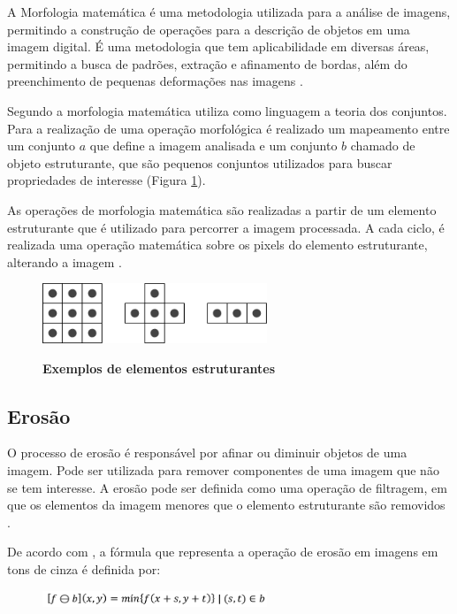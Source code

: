 \documentclass[
	12pt,				%
	oneside,			%
	a4paper,			%
	english,			%
	french,				%
	spanish,			%
	brazil,				%
	]{abntex2}
\begin{document}
A Morfologia matemática é uma metodologia utilizada para a análise de imagens, permitindo a construção de operações para a descrição de objetos em uma imagem digital.  É uma metodologia que tem aplicabilidade em diversas áreas, permitindo a busca de padrões, extração e afinamento de bordas, além do preenchimento de pequenas deformações nas imagens \cite{pedriniSchwartz:2008}.

Segundo \citet{gonzalesWoods:2008} a morfologia matemática utiliza como linguagem a teoria dos conjuntos. Para a realização de uma operação morfológica é realizado um mapeamento entre um conjunto \(a\) que define a imagem analisada e um conjunto \(b\) chamado de objeto estruturante, que são pequenos conjuntos utilizados para buscar propriedades de interesse (Figura \ref{fig:elementro_estruturante}). 

As operações de morfologia matemática são realizadas a partir de um elemento estruturante que é utilizado para percorrer a imagem processada. A cada ciclo, é realizada uma operação matemática sobre os pixels do elemento estruturante, alterando a imagem \cite{pedriniSchwartz:2008}.

\begin{figure}[ht]
\centering
\caption{\textbf{Exemplos de elementos estruturantes}}
\includegraphics[width=0.6\textwidth]{imagens/elemento_estruturante.png}
\sourceAuthor
\label{fig:elementro_estruturante}
\end{figure}

\subsection{Erosão}
O processo de erosão é responsável por afinar ou diminuir objetos de uma imagem. Pode ser utilizada para remover componentes de uma imagem que não se tem interesse. A erosão pode ser definida como uma operação de filtragem, em que os elementos da imagem menores que o elemento estruturante são removidos \cite{gonzalesWoods:2008}.

De acordo com \citet{pedriniSchwartz:2008}, a fórmula que representa a operação de erosão em imagens em tons de cinza é definida por:

\begin{figure}[ht]
\centering
\includegraphics[width=0.6\textwidth]{imagens/erosao_formula.png}
\end{figure}
\end{document}
